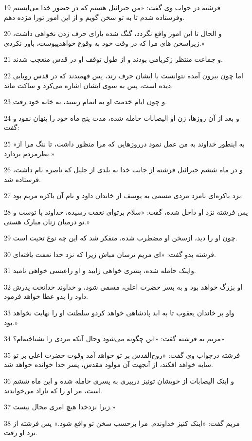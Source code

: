 \par 19 فرشته در جواب وی گفت: «من جبرائیل هستم که در حضور خدا می‌ایستم وفرستاده شدم تا به تو سخن گویم و از این امور تورا مژده دهم.
\par 20 و الحال تا این امور واقع نگردد، گنگ شده یارای حرف زدن نخواهی داشت، زیراسخن های مرا که در وقت خود به وقوع خواهدپیوست، باور نکردی.»
\par 21 و جماعت منتظر زکریامی بودند و از طول توقف او در قدس متعجب شدند.
\par 22 اما چون بیرون آمده نتوانست با ایشان حرف زند، پس فهمیدند که در قدس رویایی دیده است، پس به سوی ایشان اشاره می‌کرد و ساکت ماند.
\par 23 و چون ایام خدمت او به اتمام رسید، به خانه خود رفت.
\par 24 و بعد از آن روزها، زن او الیصابات حامله شده، مدت پنج ماه خود را پنهان نمود و گفت:
\par 25 «به اینطور خداوند به من عمل نمود درروزهایی که مرا منظور داشت، تا ننگ مرا از نظرمردم بردارد.»
\par 26 و در ماه ششم جبرائیل فرشته از جانب خدا به بلدی از جلیل که ناصره نام داشت، فرستاده شد.
\par 27 نزد باکره‌ای نامزد مردی مسمی به یوسف از خاندان داود و نام آن باکره مریم بود.
\par 28 پس فرشته نزد او داخل شده، گفت: «سلام برتو‌ای نعمت رسیده، خداوند با توست و تو درمیان زنان مبارک هستی.»
\par 29 چون او را دید، ازسخن او مضطرب شده، متفکر شد که این چه نوع تحیت است.
\par 30 فرشته بدو گفت: «ای مریم ترسان مباش زیرا که نزد خدا نعمت یافته‌ای.
\par 31 واینک حامله شده، پسری خواهی زایید و او راعیسی خواهی نامید.
\par 32 او بزرگ خواهد بود و به پسر حضرت اعلی، مسمی شود، و خداوند خداتخت پدرش داود را بدو عطا خواهد فرمود.
\par 33 واو بر خاندان یعقوب تا به ابد پادشاهی خواهد کردو سلطنت او را نهایت نخواهد بود.»
\par 34 مریم به فرشته گفت: «این چگونه می‌شود وحال آنکه مردی را نشناخته‌ام؟»
\par 35 فرشته درجواب وی گفت: «روح‌القدس بر تو خواهد آمد وقوت حضرت اعلی بر تو سایه خواهد افکند، از آنجهت آن مولود مقدس، پسر خدا خوانده خواهد شد.
\par 36 و اینک الیصابات از خویشان تونیز در‌پیری به پسری حامله شده و این ماه ششم است، مر او را که نازاد می‌خواندند.
\par 37 زیرا نزدخدا هیچ امری محال نیست.»
\par 38 مریم گفت: «اینک کنیز خداوندم. مرا برحسب سخن تو واقع شود.» پس فرشته از نزد او رفت.
